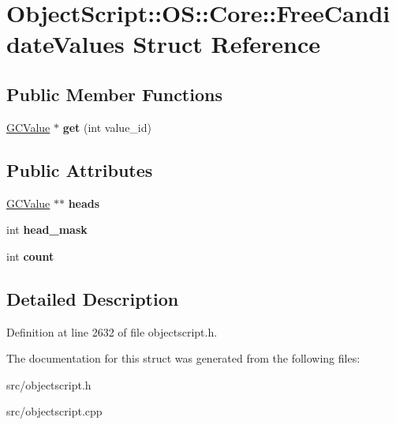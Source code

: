 \hypertarget{struct_object_script_1_1_o_s_1_1_core_1_1_free_candidate_values}{}\section{Object\+Script\+:\+:OS\+:\+:Core\+:\+:Free\+Candidate\+Values Struct Reference}
\label{struct_object_script_1_1_o_s_1_1_core_1_1_free_candidate_values}
\subsection*{Public Member Functions}
\begin{DoxyCompactItemize}
\item 
\hyperlink{struct_object_script_1_1_o_s_1_1_core_1_1_g_c_value}{G\+C\+Value} $\ast$ {\bfseries get} (int value\+\_\+id)\hypertarget{struct_object_script_1_1_o_s_1_1_core_1_1_free_candidate_values_ab04333bd4f148d14301ef43ea28f3024}{}\label{struct_object_script_1_1_o_s_1_1_core_1_1_free_candidate_values_ab04333bd4f148d14301ef43ea28f3024}

\end{DoxyCompactItemize}
\subsection*{Public Attributes}
\begin{DoxyCompactItemize}
\item 
\hyperlink{struct_object_script_1_1_o_s_1_1_core_1_1_g_c_value}{G\+C\+Value} $\ast$$\ast$ {\bfseries heads}\hypertarget{struct_object_script_1_1_o_s_1_1_core_1_1_free_candidate_values_a1895ece606ee12f19b1f1d1d007f07bf}{}\label{struct_object_script_1_1_o_s_1_1_core_1_1_free_candidate_values_a1895ece606ee12f19b1f1d1d007f07bf}

\item 
int {\bfseries head\+\_\+mask}\hypertarget{struct_object_script_1_1_o_s_1_1_core_1_1_free_candidate_values_a53f91f5a096549cf584d14f60363c8ff}{}\label{struct_object_script_1_1_o_s_1_1_core_1_1_free_candidate_values_a53f91f5a096549cf584d14f60363c8ff}

\item 
int {\bfseries count}\hypertarget{struct_object_script_1_1_o_s_1_1_core_1_1_free_candidate_values_a33eb6b2cff1e92cad4843ce5efad70c2}{}\label{struct_object_script_1_1_o_s_1_1_core_1_1_free_candidate_values_a33eb6b2cff1e92cad4843ce5efad70c2}

\end{DoxyCompactItemize}


\subsection{Detailed Description}


Definition at line 2632 of file objectscript.\+h.



The documentation for this struct was generated from the following files\+:\begin{DoxyCompactItemize}
\item 
src/objectscript.\+h\item 
src/objectscript.\+cpp\end{DoxyCompactItemize}
